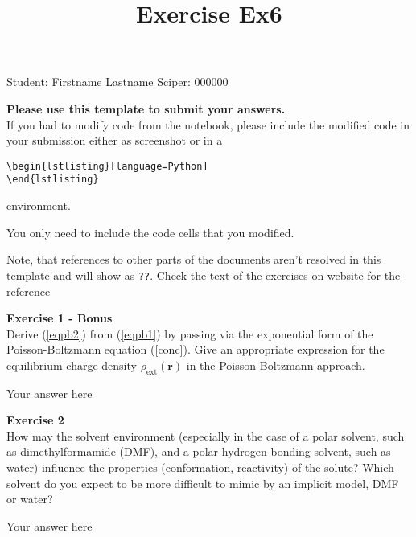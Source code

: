 \documentclass{article}
\title{Exercise Ex6}
\begin{document}
\maketitle\maketitle

Student:  Firstname Lastname    Sciper: 000000

\begin{mdframed}
\textbf{Please use this template to submit your answers.}\\
If you had to modify code from the notebook, please include the modified code in your submission either as screenshot or in a

\begin{verbatim}
\begin{lstlisting}[language=Python]
\end{lstlisting}
\end{verbatim}

environment.

You only need to include the code cells that you modified.

Note, that references to other parts of the documents aren't resolved in this template and will show as \texttt{??}. Check the text of the exercises on website for the reference
\end{mdframed}

\begin{mdframed}
\textbf{Exercise 1 - Bonus}\\
Derive (\ref{eqpb2}) from (\ref{eqpb1}) by passing via the exponential form of the Poisson-Boltzmann equation (\ref{conc}).    Give an appropriate expression for the equilibrium charge density  $\rho_\text{ext}(\mathbf{r})$ in the Poisson-Boltzmann approach.
\end{mdframed}

Your answer here

\begin{mdframed}
\textbf{Exercise 2}\\
How may the solvent environment (especially in the case of a polar
solvent, such as dimethylformamide (DMF), and a polar
hydrogen-bonding solvent, such as water) influence the properties
(conformation, reactivity) of the solute? Which solvent do you
expect to be more difficult to mimic by an implicit model, DMF or
water?
\end{mdframed}

Your answer here
\end{document}
